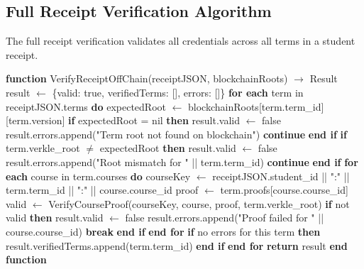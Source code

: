 \subsection{Full Receipt Verification Algorithm}
\label{subsec:receipt-verify-algo}

The full receipt verification validates all credentials across all terms in a student receipt.

\begin{algorithm}[H]
\caption{VerifyReceiptOffChain - Complete Receipt Validation}
\label{alg:verify-receipt}
\begin{algorithmic}[1]
\STATE \textbf{function} VerifyReceiptOffChain(receiptJSON, blockchainRoots) $\rightarrow$ Result
\STATE \quad result $\leftarrow$ \{valid: true, verifiedTerms: [], errors: []\}
\STATE
\STATE \quad \textbf{for each} term in receiptJSON.terms \textbf{do}
\STATE \quad \quad expectedRoot $\leftarrow$ blockchainRoots[term.term\_id][term.version]
\STATE
\STATE \quad \quad \textbf{if} expectedRoot = nil \textbf{then}
\STATE \quad \quad \quad result.valid $\leftarrow$ false
\STATE \quad \quad \quad result.errors.append("Term root not found on blockchain")
\STATE \quad \quad \quad \textbf{continue}
\STATE \quad \quad \textbf{end if}
\STATE
\STATE \quad \quad \textbf{if} term.verkle\_root $\neq$ expectedRoot \textbf{then}
\STATE \quad \quad \quad result.valid $\leftarrow$ false
\STATE \quad \quad \quad result.errors.append("Root mismatch for " || term.term\_id)
\STATE \quad \quad \quad \textbf{continue}
\STATE \quad \quad \textbf{end if}
\STATE
\STATE \quad \quad \textbf{for each} course in term.courses \textbf{do}
\STATE \quad \quad \quad courseKey $\leftarrow$ receiptJSON.student\_id || ":" || term.term\_id || ":" || course.course\_id
\STATE \quad \quad \quad proof $\leftarrow$ term.proofs[course.course\_id]
\STATE
\STATE \quad \quad \quad valid $\leftarrow$ VerifyCourseProof(courseKey, course, proof, term.verkle\_root)
\STATE
\STATE \quad \quad \quad \textbf{if} not valid \textbf{then}
\STATE \quad \quad \quad \quad result.valid $\leftarrow$ false
\STATE \quad \quad \quad \quad result.errors.append("Proof failed for " || course.course\_id)
\STATE \quad \quad \quad \quad \textbf{break}
\STATE \quad \quad \quad \textbf{end if}
\STATE \quad \quad \textbf{end for}
\STATE
\STATE \quad \quad \textbf{if} no errors for this term \textbf{then}
\STATE \quad \quad \quad result.verifiedTerms.append(term.term\_id)
\STATE \quad \quad \textbf{end if}
\STATE \quad \textbf{end for}
\STATE
\STATE \quad \textbf{return} result
\STATE \textbf{end function}
\end{algorithmic}
\end{algorithm}

